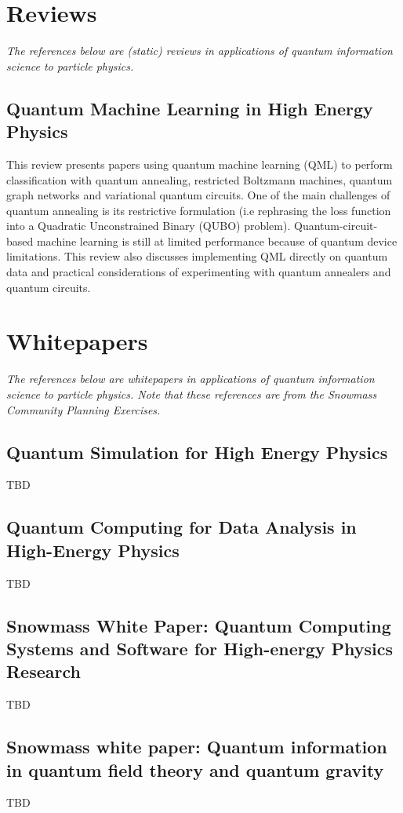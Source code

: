 \section{Reviews}

\textit{The references below are (static) reviews in applications of quantum information science to particle physics.}

\subsection{Quantum Machine Learning in High Energy Physics~\cite{Guan:2020bdl}}
This review presents papers using quantum machine learning (QML) to perform classification with quantum annealing, restricted Boltzmann machines, quantum graph networks and variational quantum circuits. One of the main challenges of quantum annealing is its restrictive formulation (i.e rephrasing the loss function into a Quadratic Unconstrained Binary (QUBO) problem). Quantum-circuit-based machine learning is still at limited performance because of quantum device limitations. This review also discusses implementing QML directly on quantum data and practical considerations of experimenting with quantum annealers and quantum circuits.


\section{Whitepapers}

\textit{The references below are whitepapers in applications of quantum information science to particle physics. Note that these references are from the Snowmass Community Planning Exercises.}

\subsection{Quantum Simulation for High Energy Physics~\cite{Bauer:2022hpo}}
TBD
\subsection{Quantum Computing for Data Analysis in High-Energy Physics~\cite{Delgado:2022tpc}}
TBD
\subsection{Snowmass White Paper: Quantum Computing Systems and Software for High-energy Physics Research~\cite{Humble:2022vtm}}
TBD
\subsection{Snowmass white paper: Quantum information in quantum field theory and quantum gravity~\cite{Faulkner:2022mlp}}
TBD
